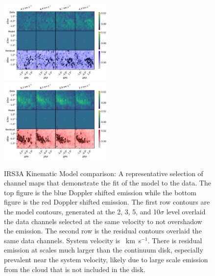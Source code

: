 \begin{figure}[H]
\begin{center}
\includegraphics[width=0.5\textwidth]{img/Channelplot_h13cnplotblue_H13CN.pdf}
\includegraphics[width=0.5\textwidth]{img/Channelplot_h13cnplotred_H13CN.pdf}
\end{center}
\caption{IRS3A Kinematic Model comparison: A representative selection of channel maps that demonstrate the fit of the model to the data. The top figure is the blue Doppler shifted emission while the bottom figure is the red Doppler shifted emission. The first row contours are the model contours, generated at the 2, 3, 5, and 10$\sigma$  level overlaid the data channels selected at the same velocity to not overshadow the emission. The second row is the residual contours overlaid the same data channels. System velocity is ~km~s$^{-1}$. There is residual emission at scales much larger than the continuum disk, especially prevalent near the system velocity, likely due to large scale emission from the cloud that is not included in the disk.}\label{fig:h13cn_res}
\end{figure}



